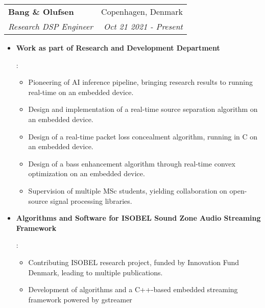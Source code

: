 \documentclass[letterpaper,11pt]{article}
\makeatletter
\newcommand{\resumeItem}[2]{
  \item\small{
    \textbf{#1}{: #2 \vspace{-2pt}}
  }
}
\newcommand{\resumeSubheading}[4]{
  \vspace{-1pt}\item
    \begin{tabular*}{0.97\textwidth}[t]{l@{\extracolsep{\fill}}r}
      \textbf{#1} & #2 \\
      \textit{\small#3} & \textit{\small #4} \\
    \end{tabular*}\vspace{-5pt}
}
\newcommand{\resumeItemListStart}{\begin{itemize}}
\newcommand{\resumeItemListEnd}{\end{itemize}\vspace{-5pt}}
\makeatother
\begin{document}
    \resumeSubheading
      {Bang \& Olufsen}{Copenhagen, Denmark}
      {Research DSP Engineer}{Oct 21 2021 - Present}
      \resumeItemListStart
        \resumeItem{Work as part of Research and Development Department}
          {
          \begin{itemize}
              \item Pioneering of AI inference pipeline, bringing research results to running real-time on an embedded device.
              \item Design and implementation of a real-time source separation algorithm on an embedded device. 
              \item Design of a real-time packet loss concealment algorithm, running in C on an embedded device.
              \item Design of a bass enhancement algorithm through real-time convex optimization on an embedded device.
              \item Supervision of multiple MSc students, yielding collaboration on open-source signal processing libraries.
          \end{itemize}
          }
        \resumeItem{Algorithms and Software for ISOBEL Sound Zone Audio Streaming Framework}
          {
          \begin{itemize}
            \item Contributing ISOBEL research project, funded by Innovation Fund Denmark, leading to multiple publications.
            \item Development of algorithms and a C++-based embedded streaming framework powered by gstreamer
          \end{itemize}
          }
      \resumeItemListEnd
      
\end{document}
